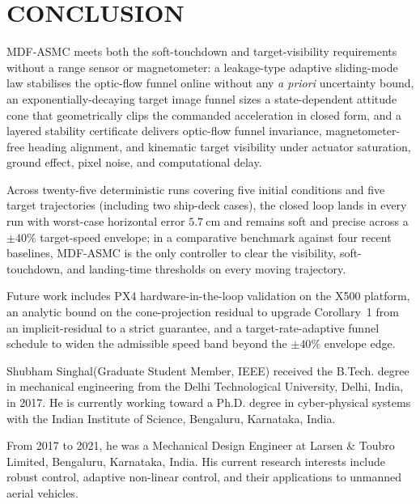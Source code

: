 \documentclass{IEEEtaes}
\begin{document}




\section{CONCLUSION}
\label{conclusion: section}
MDF-ASMC meets both the soft-touchdown and target-visibility requirements without a range sensor or magnetometer: a leakage-type adaptive sliding-mode law stabilises the optic-flow funnel online without any \emph{a priori} uncertainty bound, an exponentially-decaying target image funnel sizes a state-dependent attitude cone that geometrically clips the commanded acceleration in closed form, and a layered stability certificate delivers optic-flow funnel invariance, magnetometer-free heading alignment, and kinematic target visibility under actuator saturation, ground effect, pixel noise, and computational delay.

Across twenty-five deterministic runs covering five initial conditions and five target trajectories (including two ship-deck cases), the closed loop lands in every run with worst-case horizontal error $5.7~\text{cm}$ and remains soft and precise across a $\pm 40\%$ target-speed envelope; in a comparative benchmark against four recent baselines, MDF-ASMC is the only controller to clear the visibility, soft-touchdown, and landing-time thresholds on every moving trajectory.

Future work includes PX4 hardware-in-the-loop validation on the X500 platform, an analytic bound on the cone-projection residual to upgrade Corollary~1 from an implicit-residual to a strict guarantee, and a target-rate-adaptive funnel schedule to widen the admissible speed band beyond the $\pm 40\%$ envelope edge.



\begin{IEEEbiography}{Shubham Singhal}{\space}(Graduate Student Member, IEEE) received the B.Tech. degree in mechanical engineering from the Delhi Technological University, Delhi, India, in 2017.  He is currently working toward a Ph.D. degree in cyber-physical systems with the Indian Institute of Science, Bengaluru, Karnataka, India.

From 2017 to 2021, he was a Mechanical Design Engineer at Larsen \& Toubro Limited, Bengaluru, Karnataka, India. His current research interests include robust control, adaptive non-linear control, and their applications to unmanned aerial vehicles.
\end{IEEEbiography}%
\end{document}
